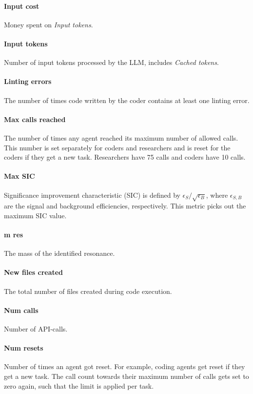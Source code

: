\documentclass[submission, Phys]{SciPost}
\begin{document}
\paragraph{Input cost} Money spent on \emph{Input tokens}.

\paragraph{Input tokens} Number of input tokens processed by the LLM, includes \emph{Cached tokens}.

\paragraph{Linting errors} The number of times code written by the coder contains at least one linting error.

\paragraph{Max calls reached} The number of times any agent reached its maximum number of allowed calls. This number is set separately for coders and researchers and is reset for the coders if they get a new task. Researchers have 75 calls and coders have 10 calls.

\paragraph{Max SIC} Significance improvement characteristic (SIC) is defined by $\epsilon_S/\sqrt{\epsilon_B}$, where $\epsilon_{S,B}$ are the signal and background efficiencies, respectively. This metric picks out the maximum SIC value.

\paragraph{m res} The mass of the identified resonance.

\paragraph{New files created} The total number of files created during code execution.   

\paragraph{Num calls}  Number of API-calls.

\paragraph{Num resets}  Number of times an agent got reset. For example, coding agents get reset if they get a new task. The call count towards their maximum number of calls gets set to zero again, such that the limit is applied per task.  
\end{document}

